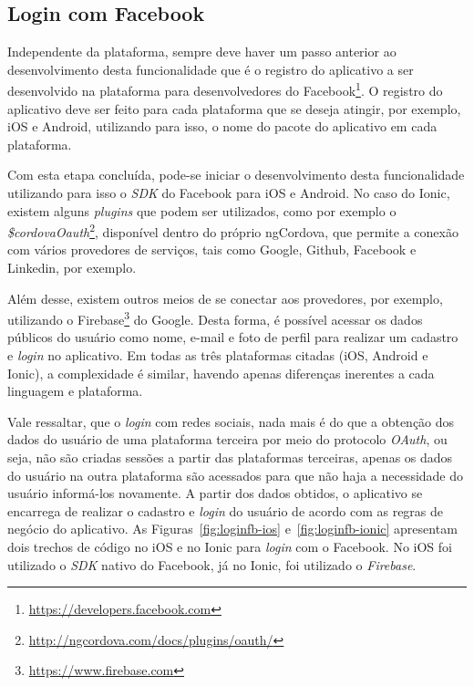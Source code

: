 \subsection{Login com Facebook} \label{subsec:loginfb}
Independente da plataforma, sempre deve haver um passo anterior ao desenvolvimento desta funcionalidade que é o registro do 
aplicativo a ser desenvolvido na plataforma para desenvolvedores do Facebook\footnote{\url{https://developers.facebook.com}}. O registro do aplicativo deve ser feito
para cada plataforma que se deseja atingir, por exemplo, iOS e Android, utilizando para isso, o nome do pacote do aplicativo em cada plataforma. 

Com esta etapa concluída, pode-se iniciar o desenvolvimento desta funcionalidade utilizando para isso o \textit{SDK} do Facebook para iOS e Android.
No caso do Ionic, existem alguns \textit{plugins} que podem ser utilizados, como por exemplo o \textit{\$cordovaOauth}\footnote{\url{http://ngcordova.com/docs/plugins/oauth/}}, disponível dentro do próprio ngCordova, 
que permite a conexão com vários provedores de serviços, tais como Google, Github, Facebook e Linkedin, por exemplo. 

Além desse, existem outros meios de se conectar aos provedores, por exemplo, utilizando o 
Firebase\footnote{\url{https://www.firebase.com}} do Google. Desta forma, é possível acessar os dados públicos do usuário como nome, e-mail e foto de perfil para realizar um cadastro e \textit{login} no aplicativo.
Em todas as três plataformas citadas (iOS, Android e Ionic), a complexidade é similar, havendo apenas diferenças inerentes a cada linguagem e plataforma. 

Vale ressaltar, que o \textit{login} com redes sociais, nada mais é do que a obtenção dos dados do usuário de uma plataforma terceira por meio do protocolo \textit{OAuth}, 
ou seja, não são criadas sessões a partir das plataformas terceiras, apenas os dados do usuário na outra plataforma são acessados para que não haja a necessidade do usuário informá-los novamente. A partir dos dados 
obtidos, o aplicativo se encarrega de realizar o cadastro e \textit{login} do usuário de acordo com as regras de negócio do aplicativo. 
As Figuras~\ref{fig:loginfb-ios} e~\ref{fig:loginfb-ionic} apresentam dois trechos de código no iOS e no Ionic para \textit{login} com o Facebook. No iOS foi utilizado o \textit{SDK} nativo do Facebook, 
já no Ionic, foi utilizado o \textit{Firebase}. 

